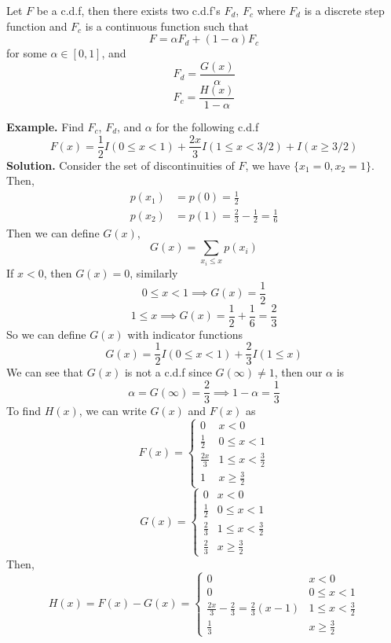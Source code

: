 \begin{theorem}
    Let $F$ be a c.d.f, then there exists two c.d.f's $F_d$, $F_c$ where $F_d$ is a discrete step function and $F_c$ is a continuous function such that
    \[F = \alpha F_d + (1- \alpha)F_c\]
    for some $\alpha \in [0,1]$, and 
    \[F_d = \frac{G(x)}{\alpha}\]
    \[F_c = \frac{H(x)}{1 - \alpha}\]
\end{theorem}
\noindent
\textbf{Example.} Find $F_c$, $F_d$, and $\alpha$ for the following c.d.f
\[F(x) = \frac{1}{2}I(0 \leq x < 1) + \frac{2x}{3}I(1 \leq x < 3/2) + I(x \geq 3/2)\]
\textbf{Solution.} Consider the set of discontinuities of $F$, we have $\{x_1 = 0, x_2 = 1\}$. Then,
\begin{align*}
    p(x_1) &= p(0) = \frac{1}{2}\\
    p(x_2) &= p(1) = \frac{2}{3} - \frac{1}{2} = \frac{1}{6}
\end{align*}
Then we can define $G(x)$, 
\[G(x) = \sum_{x_i \leq x} p(x_i)\]
If $x < 0$, then $G(x) = 0$, similarly 
\[0 \leq x < 1 \implies G(x) = \frac{1}{2}\]
\[1 \leq x \implies G(x) = \frac{1}{2} + \frac{1}{6} = \frac{2}{3}\]
So we can define $G(x)$ with indicator functions 
\[G(x) = \frac{1}{2}I(0 \leq x < 1) + \frac{2}{3}I(1 \leq x)\]
We can see that $G(x)$ is not a c.d.f since $G(\infty) \neq 1$, then our $\alpha$ is 
\[\alpha = G(\infty) = \frac{2}{3} \implies 1 - \alpha = \frac{1}{3}\]
To find $H(x)$, we can write $G(x)$ and $F(x)$ as 
\[F(x) = \begin{cases}
    0 & x < 0\\
    \frac{1}{2} & 0 \leq x < 1\\
    \frac{2x}{3} & 1 \leq x < \frac{3}{2}\\
    1 & x \geq \frac{3}{2}
\end{cases}\]
\[G(x) = \begin{cases}
    0 & x < 0\\
    \frac{1}{2} & 0 \leq x < 1\\
    \frac{2}{3} & 1 \leq x < \frac{3}{2}\\
    \frac{2}{3} & x \geq \frac{3}{2}
\end{cases}\]
Then, 
\[H(x) = F(x) - G(x) = \begin{cases}
    0 & x < 0\\
    0 & 0 \leq x < 1\\
    \frac{2x}{3} - \frac{2}{3} = \frac{2}{3}(x-1) & 1 \leq x < \frac{3}{2}\\
    \frac{1}{3} & x \geq \frac{3}{2}
\end{cases}\]
